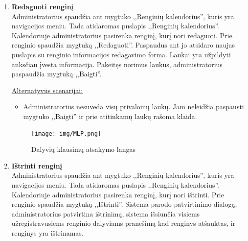 \documentclass{VUMIFPSkursinis}
\begin{document}
\begin{enumerate} [label = \textbf{U\arabic*.}]
					\underline{Alternatyvūs scenarijai:}
					\begin{itemize}
						\item Administratorius nesuveda visų privalomų laukų. Jam neleidžia paspausti mygtuko ,,Baigti'' ir prie atitinkamų laukų rašoma klaida.
					\end{itemize}
				
				\begin{figure}[H]
					\centering
					\texttt{[image: img/MLP.png]}
					\caption{Dalyvių klausimų atsakymo langas}
					\label{fig:atsakyti-klausimus}
				\end{figure}
				
			\item \textbf{Redaguoti renginį}   \\
					Administratorius spaudžia ant mygtuko ,,Renginių kalendorius'', kuris yra navigacijos meniu. Tada atidaromas puslapis ,,Renginių kalendorius''. Kalendoriuje administratorius pasirenka renginį, kurį nori redaguoti. Prie renginio spaudžia mygtuką ,,Redaguoti''. Paspaudus ant jo atsidaro naujas puslapis su renginio informacijos redagavimo forma. Laukai yra užpildyti anksčiau įvesta informacija. Pakeitęs norimus laukus, administratorius paspaudžia mygtuką ,,Baigti''.
					
					\underline{Alternatyvūs scenarijai:}
					\begin{itemize}
						\item Administratorius nesuveda visų privalomų laukų. Jam neleidžia paspausti mygtuko ,,Baigti'' ir prie atitinkamų laukų rašoma klaida.
					\end{itemize}
				
				\begin{figure}[H]
					\centering
					\texttt{[image: img/MLP.png]}
					\caption{Dalyvių klausimų atsakymo langas}
					\label{fig:atsakyti-klausimus}
				\end{figure}
				
			\item \textbf{Ištrinti renginį}   \\
					Administratorius spaudžia ant mygtuko ,,Renginių kalendorius'', kuris yra navigacijos meniu. Tada atidaromas puslapis ,,Renginių kalendorius''. Kalendoriuje administratorius pasirenka renginį, kurį nori ištrinti. Prie renginio spaudžia mygtuką ,,Ištrinti''. Sistema parodo patvirtinimo dialogą, administratorius patvirtina ištrinimą, sistema išsiunčia visiems užregistravusiems renginio dalyviams pranešimą kad renginys atšauktas, ir renginys yra ištrinamas.
					

\end{enumerate}
\end{document}
